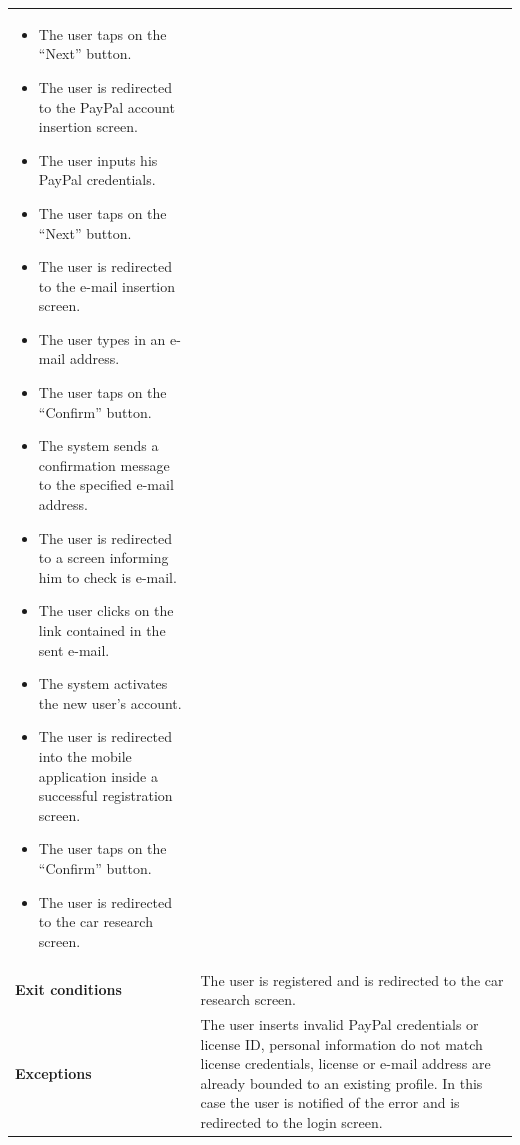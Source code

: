 \documentclass[]{article}
\begin{document}
\begin{longtable}[]{@{}ll@{}}
\begin{minipage}[t]{0.65\columnwidth}
\begin{itemize}
  in any order.
\item
  The user taps on the ``Next'' button.
\item
  The user is redirected to the PayPal account insertion screen.
\item
  The user inputs his PayPal credentials.
\item
  The user taps on the ``Next'' button.
\item
  The user is redirected to the e-mail insertion screen.
\item
  The user types in an e-mail address.
\item
  The user taps on the ``Confirm'' button.
\item
  The system sends a confirmation message to the specified e-mail
  address.
\item
  The user is redirected to a screen informing him to check is e-mail.
\item
  The user clicks on the link contained in the sent e-mail.
\item
  The system activates the new user's account.
\item
  The user is redirected into the mobile application inside a successful
  registration screen.
\item
  The user taps on the ``Confirm'' button.
\item
  The user is redirected to the car research screen.
\end{itemize}\strut
\end{minipage}\tabularnewline
\begin{minipage}[t]{0.29\columnwidth}\raggedright\strut
\textbf{Exit conditions}\strut
\end{minipage} & \begin{minipage}[t]{0.65\columnwidth}\raggedright\strut
The user is registered and is redirected to the car research
screen.\strut
\end{minipage}\tabularnewline
\begin{minipage}[t]{0.29\columnwidth}\raggedright\strut
\textbf{Exceptions}\strut
\end{minipage} & \begin{minipage}[t]{0.65\columnwidth}\raggedright\strut
The user inserts invalid PayPal credentials or license ID, personal
information do not match license credentials, license or e-mail address
are already bounded to an existing profile. In this case the user is
notified of the error and is redirected to the login screen.\strut
\end{minipage}\tabularnewline
\bottomrule
\end{longtable}
\end{document}
